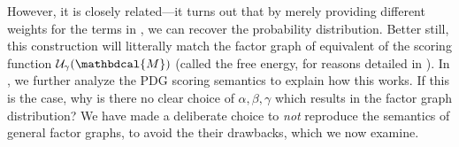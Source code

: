 \documentclass{article}
\theoremstyle{plain}
\newtheorem{coro}{Corollary}[theorem]
\theoremstyle{definition}
\theoremstyle{remark}
\newcommand{\todo}[1]{{\color{red}\ \!\Large\smash{\textbf{[}}{\normalsize\textsc{todo:} #1}\ \!\smash{\textbf{]}}}}
\newcommand{\dg}[1]{\mathbdcal{#1}}
\newcommand{\PDGof}[1]{{\dg M}_{#1}}
\numberwithin{equation}{section}
\begin{document}
{However, it is closely related---it turns out that by merely providing different weights for the terms in , we can recover the probability distribution. Better still, this construction will litterally match the factor graph of equivalent of the scoring function $\mathcal U_\gamma(\dg M)$ (called the free energy, for reasons detailed in ).
%
	In , we further analyze the PDG scoring semantics to explain how this works.
	If this is the case, why is there no clear choice of $\alpha,\beta,\gamma$ which results in the factor graph distribution?  
	We have made a deliberate choice to \emph{not} reproduce the semantics of general factor graphs, to avoid the their drawbacks, which 
	we now examine.





%		
%		

}
\end{document}
